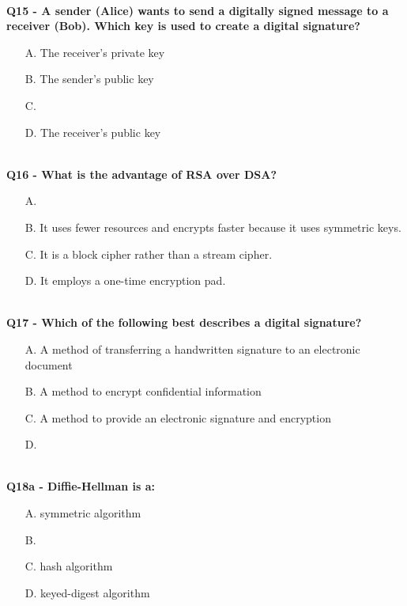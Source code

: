\textbf{\\Q15 - A sender (Alice) wants to send a digitally signed message to a receiver (Bob). Which key is used to create a digital signature?}
\begin{enumerate}
    \item[A.] The receiver’s private key
    \item[B.] The sender’s public key
    \item[C.] 
    \item[D.] The receiver’s public key
\end{enumerate}

\textbf{\\Q16 - What is the advantage of RSA over DSA?}
\begin{enumerate}
    \item[A.] 
    \item[B.] It uses fewer resources and encrypts faster because it uses symmetric keys.
    \item[C.] It is a block cipher rather than a stream cipher.
    \item[D.] It employs a one-time encryption pad.
\end{enumerate}

\textbf{\\Q17 - Which of the following best describes a digital signature?}
\begin{enumerate}
    \item[A.] A method of transferring a handwritten signature to an electronic document
    \item[B.] A method to encrypt confidential information
    \item[C.] A method to provide an electronic signature and encryption
    \item[D.] 
\end{enumerate}

\textbf{\\Q18a - Diffie-Hellman is a:}
\begin{enumerate}
    \item[A.] symmetric algorithm
    \item[B.] 
    \item[C.] hash algorithm
    \item[D.] keyed-digest algorithm
\end{enumerate}

